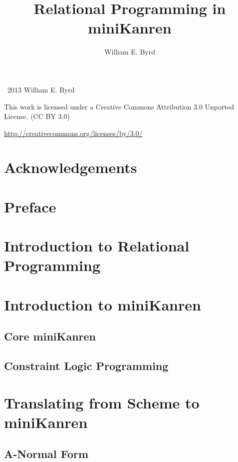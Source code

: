 \documentclass[11pt]{book}
\begin{document}
\begin{schemeregion}

\title{Relational Programming in miniKanren}
\author{William E. Byrd}
\maketitle

\newpage
\thispagestyle{empty}
\large
\noindent
\textcopyright~2013 William E. Byrd

\vspace{5mm}

\huge
\noindent
\ccLogo
\ccAttribution

\vspace{2mm}

\large
\noindent
This work is licensed under a Creative Commons Attribution 3.0 Unported License.
(CC BY 3.0)

\noindent
\url{http://creativecommons.org/licenses/by/3.0/}
\normalsize

\tableofcontents

\chapter{Acknowledgements}
\chapter{Preface}

\chapter{Introduction to Relational Programming}

\chapter{Introduction to miniKanren}
\section{Core miniKanren}
\section{Constraint Logic Programming}

\chapter{Translating from Scheme to miniKanren}
\section{A-Normal Form}

\end{schemeregion}
\end{document}
